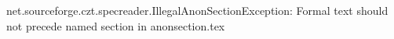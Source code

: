 net.sourceforge.czt.specreader.IllegalAnonSectionException: Formal text should not precede named section in anonsection.tex